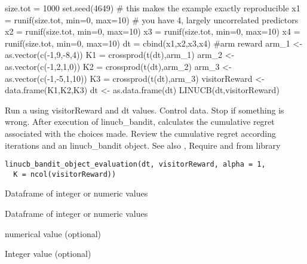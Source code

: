\documentclass[letterpaper]{book}
\begin{document}
%
\begin{Examples}
\begin{ExampleCode}
size.tot = 1000
set.seed(4649)                          # this makes the example exactly reproducible
x1 = runif(size.tot, min=0, max=10)          # you have 4, largely uncorrelated predictors
x2 = runif(size.tot, min=0, max=10)
x3 = runif(size.tot, min=0, max=10)
x4 = runif(size.tot, min=0, max=10)
dt = cbind(x1,x2,x3,x4)
#arm reward
arm_1 <-  as.vector(c(-1,9,-8,4))
K1 = crossprod(t(dt),arm_1)
arm_2 <-  as.vector(c(-1,2,1,0))
K2 = crossprod(t(dt),arm_2)
arm_3 <-  as.vector(c(-1,-5,1,10))
K3 = crossprod(t(dt),arm_3)
visitorReward <-  data.frame(K1,K2,K3)
dt <- as.data.frame(dt)
LINUCB(dt,visitorReward)
\end{ExampleCode}
\end{Examples}
%
\begin{Description}\relax
Run a  using visitorReward and dt values.
Control data.
Stop if something is wrong.
After execution of linucb\_bandit, calculates the cumulative regret
associated with the choices made.
Review the cumulative regret according iterations and an linucb\_bandit object.
See also , 
Require  and  from  library
\end{Description}
%
\begin{Usage}
\begin{verbatim}
linucb_bandit_object_evaluation(dt, visitorReward, alpha = 1,
  K = ncol(visitorReward))
\end{verbatim}
\end{Usage}
%
\begin{Arguments}
\begin{ldescription}
\item[\code{dt}] Dataframe of integer or numeric values

\item[\code{visitorReward}] Dataframe of integer or numeric values

\item[\code{alpha}] numerical value (optional)

\item[\code{K}] Integer value (optional)
\end{ldescription}
\end{Arguments}
\end{document}
